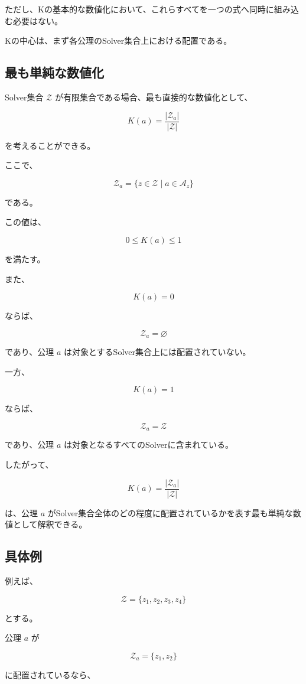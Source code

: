 ただし、Kの基本的な数値化において、これらすべてを一つの式へ同時に組み込む必要はない。

Kの中心は、まず各公理のSolver集合上における配置である。

\subsection{最も単純な数値化}

Solver集合 $\mathcal{Z}$ が有限集合である場合、最も直接的な数値化として、

\[
\boxed{
K(a) = \frac{|\mathcal{Z}_a|}{|\mathcal{Z}|}
}
\]

を考えることができる。

ここで、

\[
\mathcal{Z}_a = \{z\in\mathcal{Z}\mid a\in\mathcal{A}_z\}
\]

である。

この値は、

\[
0\leq K(a)\leq1
\]

を満たす。

また、

\[
K(a)=0
\]

ならば、

\[
\mathcal{Z}_a=\varnothing
\]

であり、公理 $a$ は対象とするSolver集合上には配置されていない。

一方、

\[
K(a)=1
\]

ならば、

\[
\mathcal{Z}_a=\mathcal{Z}
\]

であり、公理 $a$ は対象となるすべてのSolverに含まれている。

したがって、

\[
K(a) = \frac{|\mathcal{Z}_a|}{|\mathcal{Z}|}
\]

は、公理 $a$ がSolver集合全体のどの程度に配置されているかを表す最も単純な数値として解釈できる。

\subsection{具体例}

例えば、

\[
\mathcal{Z} = \{z_1,z_2,z_3,z_4\}
\]

とする。

公理 $a$ が

\[
\mathcal{Z}_a = \{z_1,z_2\}
\]

に配置されているなら、

